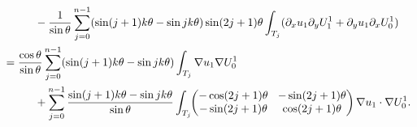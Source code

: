 \documentclass[JEP,XML,SOM,Unicode,ThmDefs,NoFloatCountersInSection,published]{cedram}
\newcommand{\colsep}{\arraycolsep4.5pt}
\theoremstyle{plain}
\theoremstyle{definition}
\begin{document}
\begin{align*}
&\hspace*{1cm}-\frac{1}{\sin \theta}\sum_{j=0}^{n-1} (\sin(j+1)k\theta-\sin jk\theta)\sin(2j+1)\theta
\int_{T_j} (\partial_x u_1 \partial_y U_1^1 + \partial_y u_1 \partial_x U_0^1)\\
&= \frac{\cos \theta}{\sin \theta}\sum_{j=0}^{n-1} (\sin(j+1)k\theta-\sin jk\theta) \int_{T_j} \nabla u_1 \nabla U_0^1\\
&\hspace*{1cm}+ \sum_{j=0}^{n-1}\dfrac{\sin(j+1)k\theta-\sin jk\theta}{\sin \theta} \int _{T_j}\colsep\hspace*{-1mm} \begin{pmatrix}
-\cos (2j+1)\theta & -\sin (2j+1) \theta \\
-\sin (2j+1)\theta & \cos (2j+1)\theta
\end{pmatrix}\nabla u_1 \cdot \nabla U_0^1.
\end{align*}
\egroup\newpage
\end{document}
